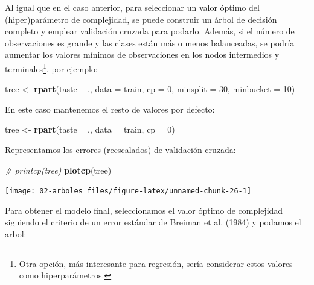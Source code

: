 \documentclass[]{book}
\newenvironment{Shaded}{\begin{snugshade}}{\end{snugshade}}
\newcommand{\KeywordTok}[1]{\textcolor[rgb]{0.13,0.29,0.53}{\textbf{#1}}}
\newcommand{\DataTypeTok}[1]{\textcolor[rgb]{0.13,0.29,0.53}{#1}}
\newcommand{\DecValTok}[1]{\textcolor[rgb]{0.00,0.00,0.81}{#1}}
\newcommand{\StringTok}[1]{\textcolor[rgb]{0.31,0.60,0.02}{#1}}
\newcommand{\CommentTok}[1]{\textcolor[rgb]{0.56,0.35,0.01}{\textit{#1}}}
\newcommand{\OperatorTok}[1]{\textcolor[rgb]{0.81,0.36,0.00}{\textbf{#1}}}
\newcommand{\NormalTok}[1]{#1}
\theoremstyle{break}
\theoremstyle{definition}
\theoremstyle{definition}
\theoremstyle{definition}
\theoremstyle{remark}
\begin{document}
Al igual que en el caso anterior, para seleccionar un valor óptimo del
(hiper)parámetro de complejidad, se puede construir un árbol de decisión
completo y emplear validación cruzada para podarlo. Además, si el número
de observaciones es grande y las clases están más o menos balanceadas,
se podría aumentar los valores mínimos de observaciones en los nodos
intermedios y terminales\footnote{Otra opción, más interesante para
  regresión, sería considerar estos valores como hiperparámetros.}, por
ejemplo:

\begin{Shaded}
\begin{Highlighting}[]
\NormalTok{tree <-}\StringTok{ }\KeywordTok{rpart}\NormalTok{(taste }\OperatorTok{~}\StringTok{ }\NormalTok{., }\DataTypeTok{data =}\NormalTok{ train, }\DataTypeTok{cp =} \DecValTok{0}\NormalTok{, }\DataTypeTok{minsplit =} \DecValTok{30}\NormalTok{, }\DataTypeTok{minbucket =} \DecValTok{10}\NormalTok{)}
\end{Highlighting}
\end{Shaded}

En este caso mantenemos el resto de valores por defecto:

\begin{Shaded}
\begin{Highlighting}[]
\NormalTok{tree <-}\StringTok{ }\KeywordTok{rpart}\NormalTok{(taste }\OperatorTok{~}\StringTok{ }\NormalTok{., }\DataTypeTok{data =}\NormalTok{ train, }\DataTypeTok{cp =} \DecValTok{0}\NormalTok{)}
\end{Highlighting}
\end{Shaded}

Representamos los errores (reescalados) de validación cruzada:

\begin{Shaded}
\begin{Highlighting}[]
\CommentTok{# printcp(tree)}
\KeywordTok{plotcp}\NormalTok{(tree)}
\end{Highlighting}
\end{Shaded}

\begin{center}\texttt{[image: 02-arboles\_files/figure-latex/unnamed-chunk-26-1]} \end{center}

Para obtener el modelo final, seleccionamos el valor óptimo de
complejidad siguiendo el criterio de un error estándar de Breiman et al.
(1984) y podamos el arbol:
\end{document}
